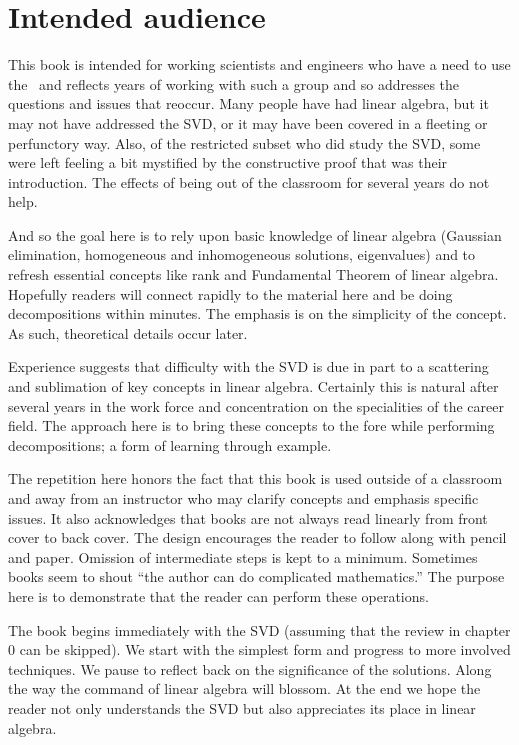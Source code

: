 \chapter*{Intended audience}

This book is intended for working scientists and engineers who have a need to use the \svdp \ and reflects years of working with such a group and so addresses the questions and issues that reoccur. Many people have had linear algebra, but it may not have addressed the SVD, or it may have been covered in a fleeting or perfunctory way. Also, of the restricted subset who did study the SVD, some were left feeling a bit mystified by the constructive proof that was their introduction. The effects of being out of the classroom for several years do not help.

And so the goal here is to rely upon basic knowledge of linear algebra (Gaussian elimination, homogeneous and inhomogeneous solutions, eigenvalues) and to refresh essential concepts like rank and Fundamental Theorem of linear algebra. Hopefully readers will connect rapidly to the material here and be doing decompositions within minutes. The emphasis is on the simplicity of the concept. As such, theoretical details occur later.

Experience suggests that difficulty with the SVD is due in part to a scattering and sublimation of key concepts in linear algebra. Certainly this is natural after several years in the work force and concentration on the specialities of the career field. The approach here is to bring these concepts to the fore while performing decompositions; a form of learning through example.

The repetition here honors the fact that this book is used outside of a classroom and away from an instructor who may clarify concepts and emphasis specific issues. It also acknowledges that books are not always read linearly from front cover to back cover. The design encourages the reader to follow along with pencil and paper. Omission of intermediate steps is kept to a minimum. Sometimes books seem to shout ``the author can do complicated mathematics.'' The purpose here is to demonstrate that the reader can perform these operations.

The book begins immediately with the SVD (assuming that the review in chapter 0 can be skipped). We start with the simplest form and progress to more involved techniques. We pause to reflect back on the significance of the solutions. Along the way the command of linear algebra will blossom. At the end we hope the reader not only understands the SVD but also appreciates its place in linear algebra. 

